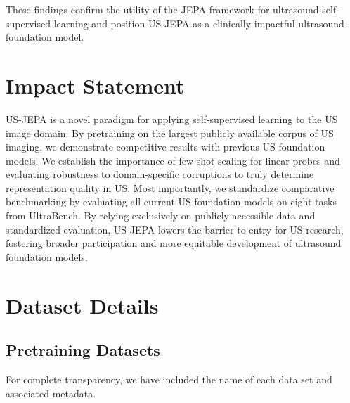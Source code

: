 \documentclass{article}
\theoremstyle{plain}
\theoremstyle{definition}
\theoremstyle{remark}
\begin{document}
These findings confirm the utility of the JEPA framework for ultrasound self-supervised learning and position US-JEPA as a clinically impactful ultrasound foundation model.

\section*{Impact Statement}

US-JEPA is a novel paradigm for applying self-supervised learning to the US image domain. By pretraining on the largest publicly available corpus of US imaging, we demonstrate competitive results with previous US foundation models. We establish the importance of few-shot scaling for linear probes and evaluating robustness to domain-specific corruptions to truly determine representation quality in US. Most importantly, we standardize comparative benchmarking by evaluating all current US foundation models on eight tasks from UltraBench. By relying exclusively on publicly accessible data and standardized evaluation, US-JEPA lowers the barrier to entry for US research, fostering broader participation and more equitable development of ultrasound foundation models.





\newpage
\appendix
\onecolumn

\section{Dataset Details}

\subsection{Pretraining Datasets}\label{app:B.1}
For complete transparency, we have included the name of each data set and associated metadata.
\end{document}
